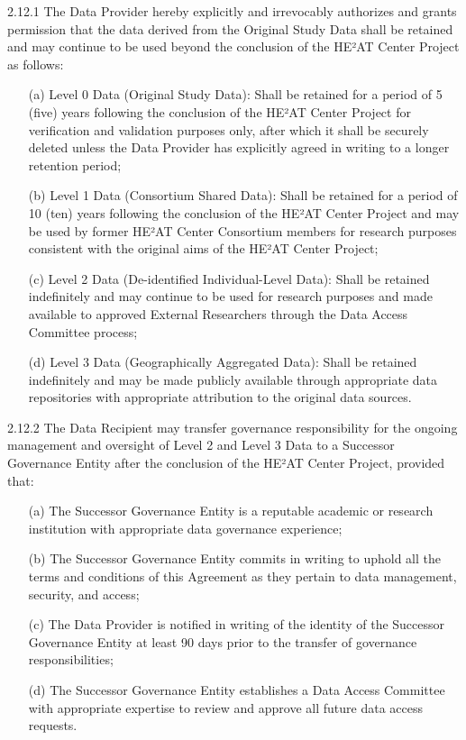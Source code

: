 \documentclass[12pt,letterpaper]{article}
\newcommand{\added}[1]{\textcolor{addcolor}{#1}}
\begin{document}
\added{2.12.1 The Data Provider hereby explicitly and irrevocably authorizes and grants permission that the data derived from the Original Study Data shall be retained and may continue to be used beyond the conclusion of the HE²AT Center Project as follows:
\begin{enumerate}
\item[(a)] Level 0 Data (Original Study Data): Shall be retained for a period of 5 (five) years following the conclusion of the HE²AT Center Project for verification and validation purposes only, after which it shall be securely deleted unless the Data Provider has explicitly agreed in writing to a longer retention period;
\item[(b)] Level 1 Data (Consortium Shared Data): Shall be retained for a period of 10 (ten) years following the conclusion of the HE²AT Center Project and may be used by former HE²AT Center Consortium members for research purposes consistent with the original aims of the HE²AT Center Project;
\item[(c)] Level 2 Data (De-identified Individual-Level Data): Shall be retained indefinitely and may continue to be used for research purposes and made available to approved External Researchers through the Data Access Committee process;
\item[(d)] Level 3 Data (Geographically Aggregated Data): Shall be retained indefinitely and may be made publicly available through appropriate data repositories with appropriate attribution to the original data sources.
\end{enumerate}}

\added{2.12.2 The Data Recipient may transfer governance responsibility for the ongoing management and oversight of Level 2 and Level 3 Data to a Successor Governance Entity after the conclusion of the HE²AT Center Project, provided that:
\begin{enumerate}
\item[(a)] The Successor Governance Entity is a reputable academic or research institution with appropriate data governance experience;
\item[(b)] The Successor Governance Entity commits in writing to uphold all the terms and conditions of this Agreement as they pertain to data management, security, and access;
\item[(c)] The Data Provider is notified in writing of the identity of the Successor Governance Entity at least 90 days prior to the transfer of governance responsibilities;
\item[(d)] The Successor Governance Entity establishes a Data Access Committee with appropriate expertise to review and approve all future data access requests.
\end{enumerate}}
\end{document}
